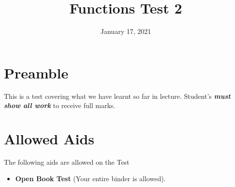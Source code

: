 \documentclass[12pt]{article} %
\title{Functions Test 2}
\date{January 17, 2021}
\begin{document}
    \renewcommand*{\coursecode}{MCR3U Quiz} %
    \renewcommand*{\assgnnumber}{1} %
    \renewcommand*{\submdate}{November, 2021} %
    \renewcommand*{\studentfname}{\textbf{Name:}} %
    \renewcommand*{\studentlname}{} %

    \renewcommand\qedsymbol{$\blacksquare$}
    \setfigpath
    \fancyhfoffset[L,O]{0pt} %




	\maketitle
	\section{Preamble}
	This is a test covering what we have learnt so far in lecture. Student's \emph{\textbf{must show all work}} to receive full marks.
	\section{Allowed Aids}
	The following aids are allowed on the Test
	\begin{itemize}
    \item \textbf{Open Book Test} (Your entire binder is allowed).
	\end{itemize}
\end{document}
